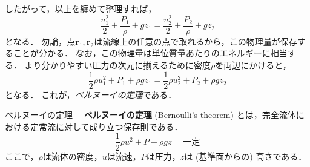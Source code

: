 \documentclass[uplatex,dvipdfmx,a4j,11pt]{jsreport}
\newcommand{\keyword}[1]{\textcolor{mainblue}{\textbf{#1}}}
\newcommand{\e}{\mathbf{e}} %
\newcommand{\diff}{\mathrm{d}} %
\numberwithin{equation}{chapter}
\begin{document}
したがって，以上を纏めて整理すれば，
\begin{equation}
  \frac{u_1^2}{2} + \frac{P_1}{\rho} + gz_1 = \frac{u_2^2}{2} + \frac{P_2}{\rho} + gz_2
\end{equation}
となる．
勿論，点$\mathbf{r}_1, \mathbf{r}_2$は流線上の任意の点で取れるから，この物理量が保存することが分かる．
なお，この物理量は単位質量あたりのエネルギーに相当する．
より分かりやすい圧力の次元に揃えるために密度$\rho$を両辺にかけると，
\begin{equation}
  \frac{1}{2}\rho u_1^2 + P_1 + \rho gz_1 = \frac{1}{2}\rho u_2^2 + P_2 + \rho gz_2 
  \label{eq:bernoulli_equation}
\end{equation}
となる．
これが，\emph{ベルヌーイの定理}である．

\begin{definition}{ベルヌーイの定理}{}{}
  　\keyword{ベルヌーイの定理} (Bernoulli's theorem) とは，完全流体における定常流に対して成り立つ保存則である．
  \begin{equation}
    \frac{1}{2}\rho u^2 + P + \rho gz = \text{一定}
  \end{equation}
  ここで，$\rho$は流体の密度，$u$は流速，$P$は圧力，$z$は (基準面からの) 高さである．
\end{definition}


\end{document}
